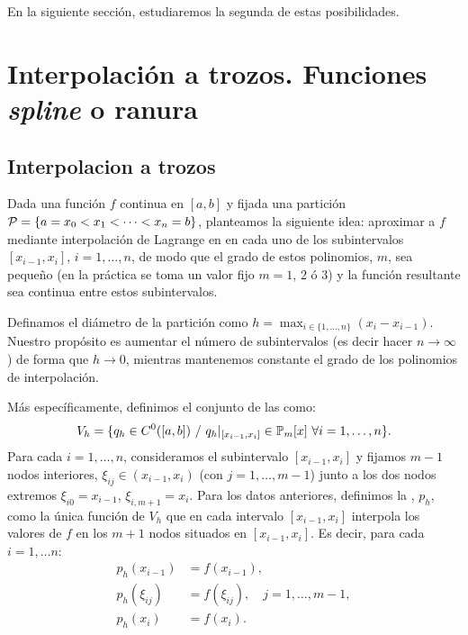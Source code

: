 En la siguiente sección, estudiaremos la segunda de estas
posibilidades.

\section{Interpolación a trozos. Funciones \textit{spline} o ranura}
\label{sec:interp-trozos-splines}

\subsection{Interpolacion a trozos}
\label{sec:interpolacion-trozos}


Dada una función $f$ continua en $[a,b]$ y fijada una partición
${\cal P}=\{a=x_0<x_1<\cdots<x_n=b\}$, planteamos la siguiente idea:
aproximar a $f$ mediante interpolación de Lagrange en en cada uno de
los subintervalos $[x_{i-1},x_{i}]$, $i=1,\dots,n$, de modo que el grado
de estos polinomios, $m$, sea pequeño (en la práctica se toma un valor
fijo $m=1$, $2$ ó $3$) y la función resultante sea continua entre
estos subintervalos.

Definamos el diámetro de la partición como
$h=\max_{i\in\{1,\dots,n\}}(x_i-x_{i-1})$. Nuestro propósito es aumentar
el número de subintervalos (es decir hacer $n\to \infty$) de forma
que $h\to 0$, mientras mantenemos constante el grado de los polinomios
de interpolación.

Más específicamente, definimos el conjunto de las  como:
\begin{equation*}
  V_h = \{ q_h\in C^0([a,b]) \ /\ q_h|_{[x_{i-1},x_{i}]}\in \Pol_m[x]\
  \forall i=1,\dots,n \}.
\end{equation*}
Para cada $i=1,\dots,n$, consideramos el subintervalo $[x_{i-1},x_i]$ y
fijamos $m-1$ nodos interiores, $\xi_{ij}\in (x_{i-1},x_i)$ (con
$j=1,\dots,m-1$) junto a los dos nodos extremos $\xi_{i0}=x_{i-1}$,
$\xi_{i,m+1}={x_i}$.  Para los datos anteriores, definimos la
, $p_h$, como
la única función de $V_h$ que en cada intervalo $[x_{i-1},x_i]$
interpola los valores de $f$ en los $m+1$ nodos situados en
$[x_{i-1}, x_{i}]$.  Es decir, para cada $i=1,\dots n$:
\begin{align*}
  p_h(x_{i-1})&=f(x_{i-1}),\\
  p_h(\xi_{ij})&=f(\xi_{ij}), \quad j=1,\dots,m-1,\\
  p_h(x_i)&=f(x_i).
\end{align*}

